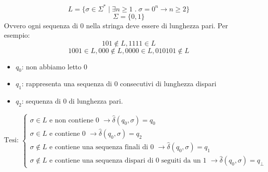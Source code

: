 \documentclass[a4paper]{article}
\begin{document}
{
\[L = \{\sigma \in \Sigma^* \; | \; \exists n \ge 1 \;  . \; \sigma = 0^n \rightarrow n \ge 2 \}\]
\[\Sigma = \{0,1\}\]
Ovvero ogni sequenza di 0 nella stringa deve essere di lunghezza pari.
Per esempio:
\[101 \notin L, 1111 \in L\]
\[1001 \in L, 000 \notin L, 0000 \in L, 010101 \notin L\]
\begin{figure}[H]
    \centering
  \end{figure}
\noindent 
\begin{itemize}
    \item $q_0$: non abbiamo letto 0
    \item $q_1$: rappresenta una sequenza di 0 consecutivi di lunghezza dispari 
    \item $q_2$: sequenza di 0 di lunghezza pari.
\end{itemize}
\[
\text{Tesi: } \begin{cases}
    \sigma \in L \text{ e non contiene 0 } \rightarrow \hat{\delta}(q_0, \sigma) = q_0\\
    \sigma \in L \text{ e contiene 0 } \rightarrow \hat{\delta}(q_0, \sigma) = q_2\\
    \sigma \notin L \text{ e contiene una sequenza finali di 0 } \rightarrow \hat{\delta}(q_0, \sigma) = q_1\\
    \sigma \notin L \text{ e contiene una sequenza dispari di 0 seguiti da un 1 } \rightarrow \hat{\delta}(q_0, \sigma) = q_{\bot}
\end{cases}
\]
}
\ex{}
\end{document}

